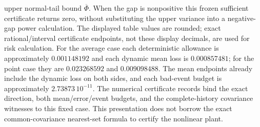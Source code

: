 \documentclass[journal]{IEEEtran}
\begin{document}
upper normal-tail bound $\overline\Phi$. When the gap is nonpositive this
frozen sufficient certificate returns zero, without substituting the upper
variance into a negative-gap power calculation.
The displayed table values are rounded; exact rational/interval certificate
endpoints, not these display decimals, are used for risk calculation.
For the average case each deterministic allowance is approximately
$0.001148192$ and each dynamic mean loss is $0.000857481$;
for the point case they are $0.023268592$ and $0.009098488$.
The mean endpoints already include the dynamic loss on both sides, and each
bad-event budget is approximately $2.73873\,10^{-11}$.
The numerical certificate records bind the exact direction, both mean/error/event
budgets, and the complete-history covariance witnesses to this fixed case. This presentation does not borrow the
exact common-covariance nearest-set formula to certify the nonlinear plant.
\end{document}
